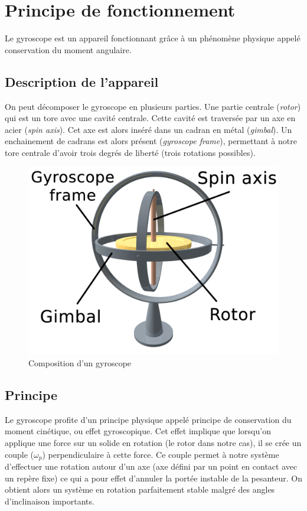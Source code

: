 \documentclass[a4paper,10pt]{report}
\begin{document}
      \section{Principe de fonctionnement}
	Le gyroscope est un appareil fonctionnant grâce à un phénomène physique 
appelé conservation du moment angulaire.
      
	\subsection{Description de l'appareil}
	  On peut décomposer le gyroscope en plusieurs parties. Une partie 
centrale (\textit{rotor}) qui est un tore avec une cavité centrale. Cette 
cavité est traversée par un axe en acier (\textit{spin axis}). Cet axe est 
alors inséré dans un cadran en métal (\textit{gimbal}). Un enchainement de 
cadrans est alors présent (\textit{gyroscope frame}), permettant à notre tore 
centrale d'avoir trois degrés de liberté (trois rotations possibles).

	  \begin{figure}[htbp]
	    \centering
	    \includegraphics[scale = 0.1]{img/3D_Gyroscope.png}
	    \caption{Composition d'un gyroscope}
	    \label{compositiongyroscope}
	  \end{figure}
	  
	\subsection{Principe}
	  Le gyroscope profite d'un principe physique appelé principe de 
conservation du moment cinétique, ou effet gyroscopique. Cet effet implique que 
lorsqu'on applique une force sur un solide en rotation (le rotor dans notre 
cas), il se crée un couple ($\omega_{p}$) perpendiculaire à cette force. Ce 
couple permet à notre système d'effectuer une rotation autour d'un axe (axe 
défini par un point en contact avec un repère fixe) ce qui a pour effet 
d'annuler la portée instable de la pesanteur. On obtient alors un système en 
rotation parfaitement stable malgré des angles d'inclinaison importants.
\end{document}

